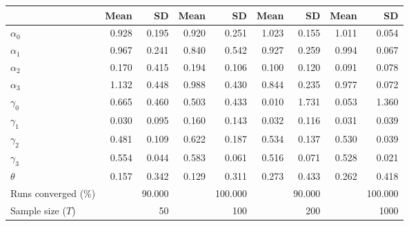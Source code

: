 
\begin{tabular}[t]{lrrrrrrrr}
\toprule
  & Mean & SD & Mean  & SD  & Mean   & SD   & Mean    & SD   \\
\midrule
$\alpha_{0}$ & 0.928 & 0.195 & 0.920 & 0.251 & 1.023 & 0.155 & 1.011 & 0.054\\
$\alpha_{1}$ & 0.967 & 0.241 & 0.840 & 0.542 & 0.927 & 0.259 & 0.994 & 0.067\\
$\alpha_{2}$ & 0.170 & 0.415 & 0.194 & 0.106 & 0.100 & 0.120 & 0.091 & 0.078\\
$\alpha_{3}$ & 1.132 & 0.448 & 0.988 & 0.430 & 0.844 & 0.235 & 0.977 & 0.072\\
$\gamma_{0}$ & 0.665 & 0.460 & 0.503 & 0.433 & 0.010 & 1.731 & 0.053 & 1.360\\
$\gamma_{1}$ & 0.030 & 0.095 & 0.160 & 0.143 & 0.032 & 0.116 & 0.031 & 0.039\\
$\gamma_{2}$ & 0.481 & 0.109 & 0.622 & 0.187 & 0.534 & 0.137 & 0.530 & 0.039\\
$\gamma_{3}$ & 0.554 & 0.044 & 0.583 & 0.061 & 0.516 & 0.071 & 0.528 & 0.021\\
$\theta$ & 0.157 & 0.342 & 0.129 & 0.311 & 0.273 & 0.433 & 0.262 & 0.418\\
Runs converged (\%) &  & 90.000 &  & 100.000 &  & 90.000 &  & 100.000\\
Sample size ($T$) &  & 50 &  & 100 &  & 200 &  & 1000\\
\bottomrule
\end{tabular}

